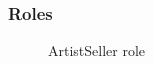 \documentclass[paper=letter, fontsize=12pt]{article}
\begin{document}
\subsubsection{Roles}
\begin{figure}[H]
  \begin{center}
    \caption{ArtistSeller role}
    \label{fig:artistseller_role}
  \end{center}
\end{figure}
\end{document}
